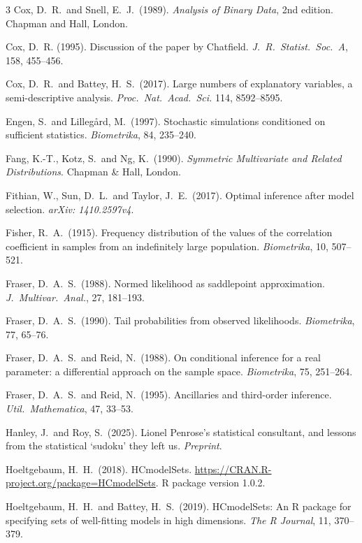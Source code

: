 \documentclass[10pt, reqno]{amsart}
\numberwithin{equation}{section}
\begin{document}
\begin{thebibliography}{3}
	Cox, D.~R.~and Snell, E.~J.~(1989). \emph{Analysis of Binary Data}, 2nd edition. Chapman and Hall, London. 
	
	Cox, D.~R. (1995). Discussion of the paper by Chatfield. \emph{J.~R.~Statist.~Soc.~A}, 158,  455--456. 
	
	Cox, D.~R.~and Battey, H.~S.~(2017). Large numbers of explanatory variables, a semi-descriptive analysis. \emph{Proc.~Nat.~Acad.~Sci.} 114, 8592--8595.
	
	Engen, S.~and Lilleg{\aa}rd, M.~(1997). Stochastic simulations conditioned on sufficient statistics. \emph{Biometrika}, 84, 235--240.
	
	Fang, K.-T., Kotz, S.~and Ng, K.~(1990). \emph{Symmetric Multivariate and Related Distributions}. Chapman \& Hall, London.
	
	Fithian, W., Sun, D.~L.~and Taylor, J.~E.~(2017). Optimal inference after model selection. \emph{arXiv: 1410.2597v4}.
	
	
	Fisher, R.~A.~(1915). Frequency distribution of the values of the correlation coefficient in samples from an indefinitely large population. \emph{Biometrika},  10, 507--521.
	
	Fraser, D.~A.~S.~(1988). Normed likelihood as saddlepoint approximation. \emph{J.~Multivar.~Anal.}, 27, 181--193.
	
	Fraser, D.~A.~S.~(1990). Tail probabilities from observed likelihoods. \emph{Biometrika}, 77, 65--76.
	
	Fraser, D.~A.~S.~and Reid, N.~(1988). On conditional inference for a real parameter: a differential approach on the sample space. \emph{Biometrika}, 75, 251--264.
	
	Fraser, D.~A.~S.~and Reid, N.~(1995). Ancillaries and third-order inference. \emph{Util.~Mathematica}, 47, 33--53.
	
	Hanley, J.~and Roy, S.~(2025).
	Lionel Penrose's statistical consultant, and lessons from the statistical `sudoku' they left us.
	\textit{Preprint}.	
	
	Hoeltgebaum, H.~H.~(2018). HCmodelSets. \url{https://CRAN.R-project.org/package=HCmodelSets}. R package version 1.0.2.
	
	Hoeltgebaum, H.~H.~and Battey, H.~S.~(2019). HCmodelSets: An R package for specifying sets of well-fitting models in high dimensions. \emph{The R Journal}, 11, 370--379.
	

\end{thebibliography}
\end{document}
